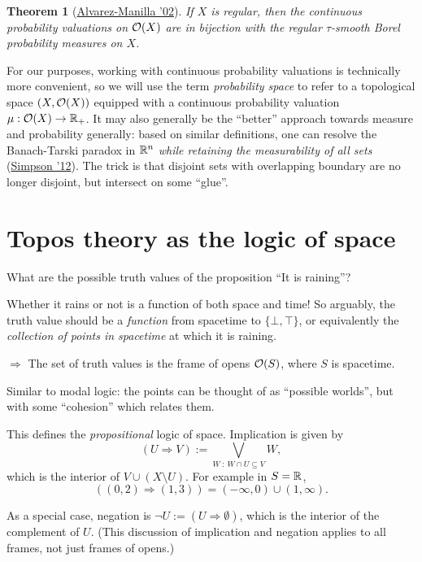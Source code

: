 \documentclass[11pt, oneside, article]{memoir}
\theoremstyle{plain}
\newtheorem{theorem}{Theorem}[chapter] %
\theoremstyle{definition}
\theoremstyle{remark}
\begin{document}
\begin{theorem}[\href{https://www.sciencedirect.com/science/article/pii/S0166864101002498}{Alvarez-Manilla '02}]
If $X$ is regular, then the continuous probability valuations on $\mathcal{O}(X)$ are in bijection with the regular $\tau$-smooth Borel probability measures on $X$.
\end{theorem}

For our purposes, working with continuous probability valuations is technically more convenient, so we will use the term \emph{probability space} to refer to a topological space $(X,\mathcal{O}(X))$ equipped with a continuous probability valuation $\mu : \mathcal{O}(X)\to\mathbb{R}_+$. It may also generally be the ``better'' approach towards measure and probability generally: based on similar definitions, one can resolve the Banach-Tarski paradox in $\mathbb{R}^n$ \emph{while retaining the measurability of all sets} (\href{https://www.sciencedirect.com/science/article/pii/S0168007211001874}{Simpson '12}). The trick is that disjoint sets with overlapping boundary are no longer disjoint, but intersect on some ``glue''.

\chapter{Topos theory as the logic of space}

What are the possible truth values of the proposition ``It is raining''?

Whether it rains or not is a function of both space and time! So arguably, the truth value should be a \emph{function} from spacetime to $\{\bot,\top\}$, or equivalently the \emph{collection of points in spacetime} at which it is raining. 

$\Rightarrow$ The set of truth values is the frame of opens $\mathcal{O}(S)$, where $S$ is spacetime. 

Similar to modal logic: the points can be thought of as ``possible worlds'', but with some ``cohesion'' which relates them.

This defines the \emph{propositional} logic of space. Implication is given by
\[
	(U \Rightarrow V) := \bigvee_{W \: : \: W \cap U \subseteq V} W,
\]
which is the interior of $V\cup (X\setminus U)$. For example in $S = \mathbb{R}$,
\[
	((0,2) \Rightarrow (1,3)) = (-\infty, 0) \cup (1,\infty).
\]

As a special case, negation is $\lnot U := (U \Rightarrow \emptyset)$, which is the interior of the complement of $U$. (This discussion of implication and negation applies to all frames, not just frames of opens.)
\end{document}
